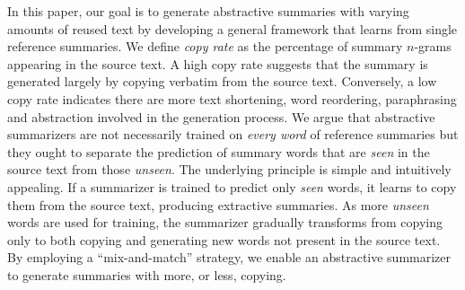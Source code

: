 \documentclass[letterpaper]{article} %
\begin{document}
In this paper, our goal is to generate abstractive summaries with varying amounts of reused text by developing a general framework that learns from single reference summaries.
We define \emph{copy rate} as the percentage of summary $n$-grams appearing in the source text.
A high copy rate suggests that the summary is generated largely by copying verbatim from the source text.
Conversely, a low copy rate indicates there are more text shortening, word reordering, paraphrasing and abstraction involved in the generation process.
We argue that abstractive summarizers are not necessarily trained on \emph{every word} of reference summaries but they ought to separate the prediction of summary words that are \emph{seen} in the source text from those \emph{unseen}.
The underlying principle is simple and intuitively appealing. 
If a summarizer is trained to predict only \emph{seen} words, it learns to copy them from the source text, producing extractive summaries.
As more \emph{unseen} words are used for training, the summarizer gradually transforms from copying only to both copying and generating new words not present in the source text. 
By employing a ``mix-and-match'' strategy, we enable an abstractive summarizer to generate summaries with more, or less, copying.
\end{document}
